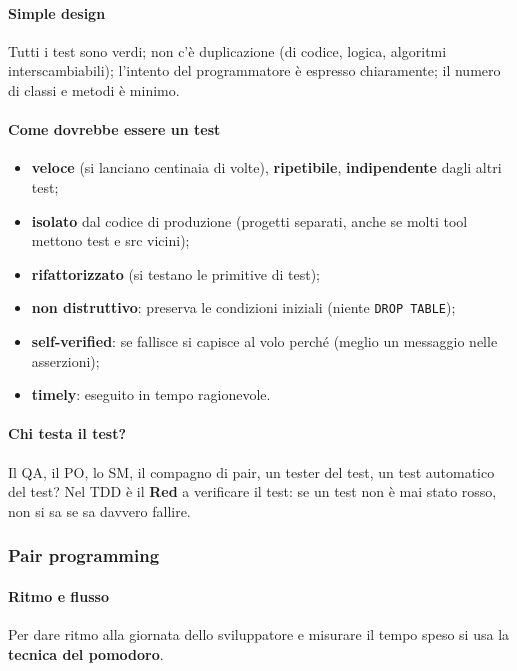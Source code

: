 \documentclass[a4paper,12pt]{article}
\begin{document}
\paragraph{Simple design} Tutti i test sono verdi; non c'è duplicazione (di codice, logica,
algoritmi interscambiabili); l'intento del programmatore è espresso chiaramente; il numero
di classi e metodi è minimo.

\paragraph{Come dovrebbe essere un test}
\begin{itemize}[nosep]
  \item \textbf{veloce} (si lanciano centinaia di volte), \textbf{ripetibile},
        \textbf{indipendente} dagli altri test;
  \item \textbf{isolato} dal codice di produzione (progetti separati, anche se molti tool
        mettono test e src vicini);
  \item \textbf{rifattorizzato} (si testano le primitive di test);
  \item \textbf{non distruttivo}: preserva le condizioni iniziali (niente \texttt{DROP TABLE});
  \item \textbf{self-verified}: se fallisce si capisce al volo perché (meglio un messaggio
        nelle asserzioni);
  \item \textbf{timely}: eseguito in tempo ragionevole.
\end{itemize}

\paragraph{Chi testa il test?} Il QA, il PO, lo SM, il compagno di pair, un tester del test,
un test automatico del test? Nel TDD è il \textbf{Red} a verificare il test: se un test
non è mai stato rosso, non si sa se sa davvero fallire.

\subsubsection{Pair programming}
\paragraph{Ritmo e flusso} Per dare ritmo alla giornata dello sviluppatore e misurare il
tempo speso si usa la \textbf{tecnica del pomodoro}.
\end{document}
